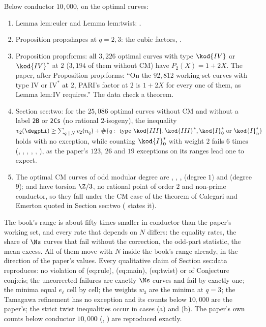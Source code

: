 \begin{sloppypar}
\begin{example}\label{ex:computation:repro-further}
Below conductor $10{,}000$, on the optimal curves:
\begin{enumerate}[label=(\alph*)]
\item Lemma lem:euler and Lemma lem:twist: .
\item Proposition prop:shapes at $q=2,3$: the cubic factors, .
\item Proposition prop:forms: all $3{,}226$ optimal curves with type $\kod{IV}$ or $\kod{IV}^*$ at $2$ ($3{,}194$ of them without CM) have $P_2(X)=1+2X$. The paper, after Proposition prop:forms: ``On the $92{,}812$ working-set curves with type $\mathrm{IV}$ or $\mathrm{IV}^*$ at $2$, PARI's
factor at $2$ is $1+2X$ for every one of them, as Lemma lem:IV requires.'' The data check a theorem.
\item Section sec:two: for the $25{,}086$ optimal curves without CM and without a label \texttt{2B} or \texttt{2Cs} (no rational $2$-isogeny), the inequality
$v_2(\degphi)\ge\sum_{q\,\|\,N}v_2(n_q)+\#\{q:\ \text{type }\kod{III},\kod{III}^*,\kod{I}_0^*\text{ or }\kod{I}_n^*\}$ holds with no exception, while counting $\kod{I}_0^*$ with weight $2$ fails
$6$ times (, , , , , ), as the paper's $123$, $26$ and $19$ exceptions on its ranges lead one to expect.
\item The optimal CM curves of odd modular degree are , , ,  (degree $1$) and  (degree $9$);  and
 have torsion $\Z/3$, no rational point of order $2$ and non-prime conductor, so they fall under the CM case of the theorem of Calegari and Emerton
quoted in Section sec:two ( states it).
\end{enumerate}
\end{example}

\begin{remark}\label{rem:computation:comparison}
The book's range is about fifty times smaller in conductor than the paper's working set, and every rate that depends on $N$ differs: the equality rates,
the share of $\Ns$ curves that fail without the correction, the odd-part statistic, the mean excess. All of them move with $N$ inside the book's range
already, in the direction of the paper's values. Every qualitative claim of Section sec:data reproduces: no violation of (eq:rule), (eq:main),
(eq:twist) or of Conjecture conj:eis; the uncorrected failures are exactly $\Ns$ curves and fail by exactly one; the minima equal $e_\ell$ cell by cell; the
weights $w_3$ are the minima at $q=3$; the Tamagawa refinement has no exception and its counts below $10{,}000$ are the paper's; the strict twist
inequalities occur in cases (a) and (b). The paper's own counts below conductor $10{,}000$ (,
) are reproduced exactly.
\end{remark}


\end{sloppypar}
